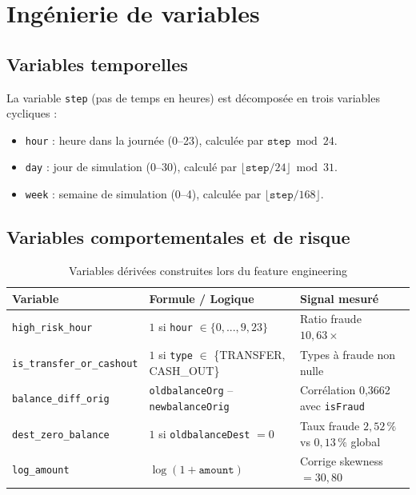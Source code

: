 \documentclass[12pt,a4paper,twoside]{report}
\begin{document}
\section{Ingénierie de variables}

\subsection{Variables temporelles}

La variable \texttt{step} (pas de temps en heures) est décomposée en trois variables cycliques :

\begin{itemize}
  \item \texttt{hour} : heure dans la journée (0--23), calculée par $\texttt{step} \bmod 24$.
  \item \texttt{day} : jour de simulation (0--30), calculé par $\lfloor \texttt{step} / 24 \rfloor \bmod 31$.
  \item \texttt{week} : semaine de simulation (0--4), calculée par $\lfloor \texttt{step} / 168 \rfloor$.
\end{itemize}

\subsection{Variables comportementales et de risque}

\begin{table}[H]
\centering
\caption{Variables dérivées construites lors du feature engineering}
\label{tab:features_derivees}
\begin{tabular}{lll}
\toprule
\textbf{Variable} & \textbf{Formule / Logique} & \textbf{Signal mesuré} \\
\midrule
\texttt{high\_risk\_hour}       & $1$ si \texttt{hour} $\in \{0,...,9, 23\}$ & Ratio fraude $10,63\times$ \\
\texttt{is\_transfer\_or\_cashout} & $1$ si \texttt{type} $\in$ \{TRANSFER, CASH\_OUT\} & Types à fraude non nulle \\
\texttt{balance\_diff\_orig}    & \texttt{oldbalanceOrg} -- \texttt{newbalanceOrig} & Corrélation 0,3662 avec \texttt{isFraud} \\
\texttt{dest\_zero\_balance}    & $1$ si \texttt{oldbalanceDest} $= 0$ & Taux fraude $2,52\,\%$ vs $0,13\,\%$ global \\
\texttt{log\_amount}            & $\log(1 + \texttt{amount})$          & Corrige skewness $= 30,80$ \\
\bottomrule
\end{tabular}
\end{table}
\end{document}
